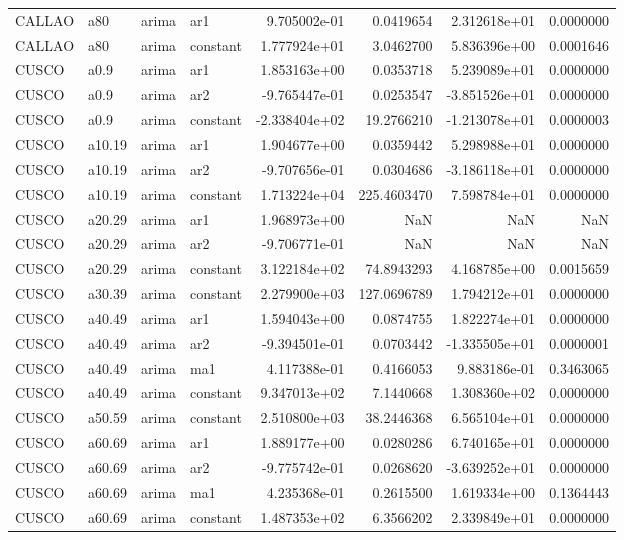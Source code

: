 \documentclass[
]{article}
\begin{document}
\begin{table}[!h]
\begin{tabular}[t]{llllrrrr}
CALLAO & a80 & arima & ar1 & 9.705002e-01 & 0.0419654 & 2.312618e+01 & 0.0000000\\
CALLAO & a80 & arima & constant & 1.777924e+01 & 3.0462700 & 5.836396e+00 & 0.0001646\\
CUSCO & a0.9 & arima & ar1 & 1.853163e+00 & 0.0353718 & 5.239089e+01 & 0.0000000\\
CUSCO & a0.9 & arima & ar2 & -9.765447e-01 & 0.0253547 & -3.851526e+01 & 0.0000000\\
\addlinespace
CUSCO & a0.9 & arima & constant & -2.338404e+02 & 19.2766210 & -1.213078e+01 & 0.0000003\\
CUSCO & a10.19 & arima & ar1 & 1.904677e+00 & 0.0359442 & 5.298988e+01 & 0.0000000\\
CUSCO & a10.19 & arima & ar2 & -9.707656e-01 & 0.0304686 & -3.186118e+01 & 0.0000000\\
CUSCO & a10.19 & arima & constant & 1.713224e+04 & 225.4603470 & 7.598784e+01 & 0.0000000\\
CUSCO & a20.29 & arima & ar1 & 1.968973e+00 & NaN & NaN & NaN\\
\addlinespace
CUSCO & a20.29 & arima & ar2 & -9.706771e-01 & NaN & NaN & NaN\\
CUSCO & a20.29 & arima & constant & 3.122184e+02 & 74.8943293 & 4.168785e+00 & 0.0015659\\
CUSCO & a30.39 & arima & constant & 2.279900e+03 & 127.0696789 & 1.794212e+01 & 0.0000000\\
CUSCO & a40.49 & arima & ar1 & 1.594043e+00 & 0.0874755 & 1.822274e+01 & 0.0000000\\
CUSCO & a40.49 & arima & ar2 & -9.394501e-01 & 0.0703442 & -1.335505e+01 & 0.0000001\\
\addlinespace
CUSCO & a40.49 & arima & ma1 & 4.117388e-01 & 0.4166053 & 9.883186e-01 & 0.3463065\\
CUSCO & a40.49 & arima & constant & 9.347013e+02 & 7.1440668 & 1.308360e+02 & 0.0000000\\
CUSCO & a50.59 & arima & constant & 2.510800e+03 & 38.2446368 & 6.565104e+01 & 0.0000000\\
CUSCO & a60.69 & arima & ar1 & 1.889177e+00 & 0.0280286 & 6.740165e+01 & 0.0000000\\
CUSCO & a60.69 & arima & ar2 & -9.775742e-01 & 0.0268620 & -3.639252e+01 & 0.0000000\\
\addlinespace
CUSCO & a60.69 & arima & ma1 & 4.235368e-01 & 0.2615500 & 1.619334e+00 & 0.1364443\\
CUSCO & a60.69 & arima & constant & 1.487353e+02 & 6.3566202 & 2.339849e+01 & 0.0000000\\

\end{tabular}
\end{table}
\end{document}
